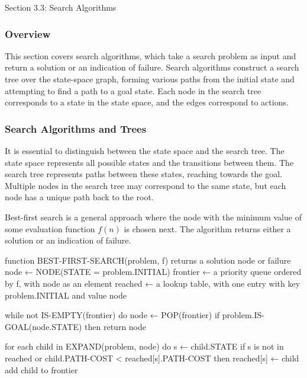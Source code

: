\begin{notes}{Section 3.3: Search Algorithms}
    \subsubsection*{Overview}

    This section covers search algorithms, which take a search problem as input and return a solution or an indication of failure. Search algorithms construct a search tree over the state-space graph, 
    forming various paths from the initial state and attempting to find a path to a goal state. Each node in the search tree corresponds to a state in the state space, and the edges correspond to actions.

    \subsubsection*{Search Algorithms and Trees}

    It is essential to distinguish between the state space and the search tree. The state space represents all possible states and the transitions between them. The search tree represents paths between 
    these states, reaching towards the goal. Multiple nodes in the search tree may correspond to the same state, but each node has a unique path back to the root.

    \begin{highlight}
        Best-first search is a general approach where the node with the minimum value of some evaluation function $ f(n) $ is chosen next. The algorithm returns either a solution or an indication of failure.

    \begin{code}[Puseudo]
    function BEST-FIRST-SEARCH(problem, f) returns a solution node or failure
        node ← NODE(STATE = problem.INITIAL)
        frontier ← a priority queue ordered by f, with node as an element
        reached ← a lookup table, with one entry with key problem.INITIAL and value node

        while not IS-EMPTY(frontier) do
            node ← POP(frontier)
            if problem.IS-GOAL(node.STATE) then return node

            for each child in EXPAND(problem, node) do
                s ← child.STATE
                if s is not in reached or child.PATH-COST < reached[s].PATH-COST then
                    reached[s] ← child
                    add child to frontier


\end{code}
\end{highlight}
\end{notes}
